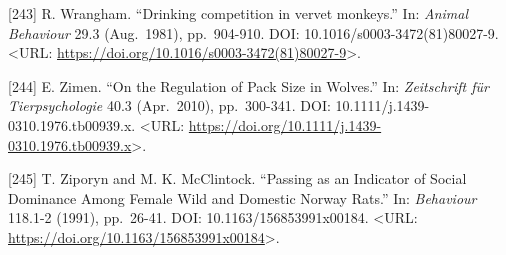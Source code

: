 \documentclass[
]{article}
\begin{document}
{[}243{]} R. Wrangham. ``Drinking competition in vervet monkeys.'' In:
\emph{Animal Behaviour} 29.3 (Aug.~1981), pp.~904-910. DOI:
10.1016/s0003-3472(81)80027-9. \textless URL:
\url{https://doi.org/10.1016/s0003-3472(81)80027-9}\textgreater.

{[}244{]} E. Zimen. ``On the Regulation of Pack Size in Wolves.'' In:
\emph{Zeitschrift für Tierpsychologie} 40.3 (Apr.~2010), pp.~300-341.
DOI: 10.1111/j.1439-0310.1976.tb00939.x. \textless URL:
\url{https://doi.org/10.1111/j.1439-0310.1976.tb00939.x}\textgreater.

{[}245{]} T. Ziporyn and M. K. McClintock. ``Passing as an Indicator of
Social Dominance Among Female Wild and Domestic Norway Rats.'' In:
\emph{Behaviour} 118.1-2 (1991), pp.~26-41. DOI:
10.1163/156853991x00184. \textless URL:
\url{https://doi.org/10.1163/156853991x00184}\textgreater.
\end{document}

